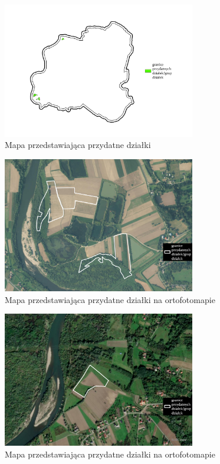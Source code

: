 \documentclass{article}
\begin{document}
\begin{figure}[H]
    \centering
    \includegraphics[width=0.75\textwidth]{img/plesna-przydatne-dzialki.jpg}
    \caption{Mapa przedstawiająca przydatne działki}
\end{figure}

\begin{figure}[H]
    \centering
    \includegraphics[width=0.75\textwidth]{img/plesna-dzialki-przydatne-ortofoto.jpg}
    \caption{Mapa przedstawiająca przydatne działki na ortofotomapie}
\end{figure}

\begin{figure}[H]
    \centering
    \includegraphics[width=0.75\textwidth]{img/plesna-dzialki-przydatne-ortofoto-2.jpg}
    \caption{Mapa przedstawiająca przydatne działki na ortofotomapie}
\end{figure}
\end{document}
